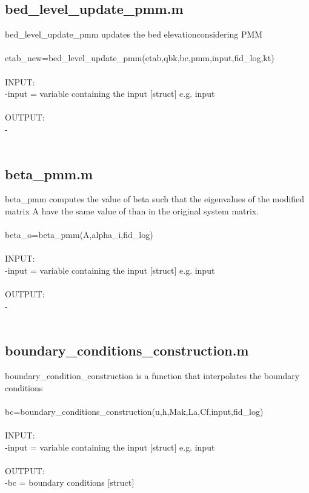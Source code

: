 \subsection{bed\_level\_update\_pmm.m}
bed\_level\_update\_pmm updates the bed elevationconsidering PMM \\ 
 \\ 
etab\_new=bed\_level\_update\_pmm(etab,qbk,bc,pmm,input,fid\_log,kt) \\ 
 \\ 
INPUT: \\ 
   -input = variable containing the input $[$struct$]$ e.g. input \\ 
 \\ 
OUTPUT: \\ 
   - \\ 
 \\ 
\subsection{beta\_pmm.m}
beta\_pmm computes the value of beta such that the eigenvalues of the modified matrix A have the same value of than in the original system matrix. \\ 
 \\ 
beta\_o=beta\_pmm(A,alpha\_i,fid\_log) \\ 
 \\ 
INPUT: \\ 
   -input = variable containing the input $[$struct$]$ e.g. input \\ 
 \\ 
OUTPUT: \\ 
   - \\ 
 \\ 
\subsection{boundary\_conditions\_construction.m}
boundary\_condition\_construction is a function that interpolates the boundary conditions \\ 
 \\ 
bc=boundary\_conditions\_construction(u,h,Mak,La,Cf,input,fid\_log) \\ 
 \\ 
INPUT: \\ 
   -input = variable containing the input $[$struct$]$ e.g. input \\ 
 \\ 
OUTPUT: \\ 
   -bc = boundary conditions $[$struct$]$  \\ 
 \\ 
